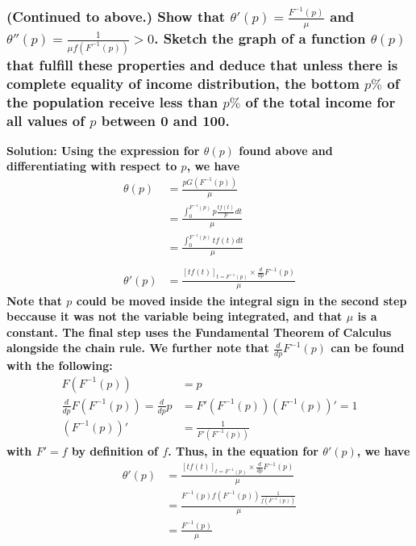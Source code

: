 \documentclass{article}
\begin{document}
\hrulefill
\subsubsection*{(Continued to above.) Show that $\theta'(p) = \frac{F^{-1}(p)}{\mu}$ and $\theta''(p) = \frac{1}{\mu f(F^{-1}(p))} > 0$. Sketch the graph of a function $\theta(p)$ that fulfill these properties and deduce that unless there is complete equality of income distribution, the bottom $p \%$ of the population receive less than $p \%$ of the total income for all values of $p$ between 0 and 100.}
\bf Solution: \normalfont
Using the expression for $\theta(p)$ found above and differentiating with respect to $p$, we have
\begin{equation*}
    \begin{aligned}
        \theta(p) &= \frac{pG(F^{-1}(p))}{\mu} \\
        &= \frac{\int_{0}^{F^{-1}(p)} p \frac{t f(t)}{p} dt}{\mu} \\
        &= \frac{\int_{0}^{F^{-1}(p)} t f(t) dt}{\mu} \\ 
        \\
        \theta'(p) &= \frac{[t f(t)]_{t = F^{-1}(p)} \times \frac{d}{dp}F^{-1}(p)}{\mu}
    \end{aligned}
\end{equation*}
Note that $p$ could be moved inside the integral sign in the second step beccause it was not the variable being integrated, and that $\mu$ is a constant. The final step uses the Fundamental Theorem of Calculus alongside the chain rule. We further note that $\frac{d}{dp}F^{-1}(p)$ can be found with the following:
\begin{equation*}
    \begin{aligned}
        F(F^{-1}(p)) &= p \\
        \frac{d}{dp} F(F^{-1}(p)) = \frac{d}{dp} p &= F'(F^{-1}(p)) (F^{-1}(p))' = 1 \\
        (F^{-1}(p))' &= \frac{1}{F'(F^{-1}(p))}
    \end{aligned}
\end{equation*}
with $F' = f$ by definition of $f$. Thus, in the equation for $\theta'(p)$, we have
\begin{equation*}
    \begin{aligned}
        \theta'(p) &= \frac{[t f(t)]_{t = F^{-1}(p)} \times \frac{d}{dp}F^{-1}(p)}{\mu} \\
        &= \frac{F^{-1}(p) f(F^{-1}(p)) \frac{1}{f(F^{-1}(p))}}{\mu} \\
        &= \frac{F^{-1}(p)}{\mu}
    \end{aligned}
\end{equation*}
\end{document}
